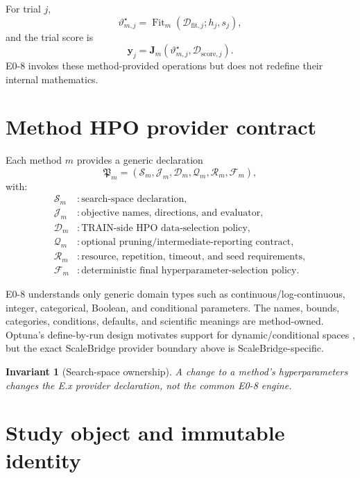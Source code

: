 \documentclass[11pt]{article}
\newcommand{\Data}{\mathcal{D}}
\newcommand{\Provider}{\mathfrak{P}}
\newtheorem{invariant}{Invariant}
\begin{document}
For trial $j$,
\[
\vartheta_{m,j}^{\star}
=
\operatorname{Fit}_m(\Data_{\mathrm{fit},j};h_j,s_j),
\]
and the trial score is
\[
\mathbf y_j
=
\mathbf J_m(\vartheta_{m,j}^{\star},\Data_{\mathrm{score},j}).
\]
E0-8 invokes these method-provided operations but does not redefine their
internal mathematics.

\section{Method HPO provider contract}

Each method $m$ provides a generic declaration
\[
\boxed{
\Provider_m=
(\mathcal S_m,\mathcal J_m,\mathcal D_m,\mathcal Q_m,\mathcal R_m,\mathcal F_m),
}
\]
with:
\begin{align*}
\mathcal S_m &: \text{search-space declaration},\\
\mathcal J_m &: \text{objective names, directions, and evaluator},\\
\mathcal D_m &: \text{TRAIN-side HPO data-selection policy},\\
\mathcal Q_m &: \text{optional pruning/intermediate-reporting contract},\\
\mathcal R_m &: \text{resource, repetition, timeout, and seed requirements},\\
\mathcal F_m &: \text{deterministic final hyperparameter-selection policy}.
\end{align*}

E0-8 understands only generic domain types such as continuous/log-continuous,
integer, categorical, Boolean, and conditional parameters. The names, bounds,
categories, conditions, defaults, and scientific meanings are method-owned.
Optuna's define-by-run design motivates support for dynamic/conditional spaces
\cite{AkibaEtAl2019Optuna}, but the exact ScaleBridge provider boundary above is
ScaleBridge-specific.

\begin{invariant}[Search-space ownership]
A change to a method's hyperparameters changes the E.x provider declaration,
not the common E0-8 engine.
\end{invariant}

\section{Study object and immutable identity}
\end{document}
